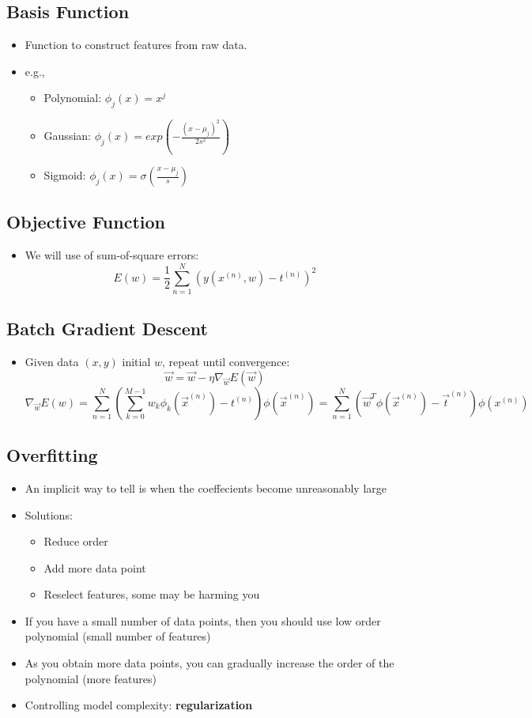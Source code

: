 \subsection{Basis Function}
\begin{itemize}
	\item Function to construct features from raw data.
	\item e.g.,
	\begin{itemize}
		\item Polynomial: $\phi_j(x)=x^j$
		\item Gaussian: $\phi_j(x)=exp(-\frac{(x-\mu_j)^2}{2s^2})$
		\item Sigmoid: $\phi_j(x)=\sigma (\frac{x-\mu_j}{s})$
	\end{itemize}
\end{itemize}

\subsection{Objective Function}
\begin{itemize}
	\item We will use of sum-of-square errors:
	$$E(w)=\frac{1}{2}\sum_{n=1}^N (y(x^{(n)}, w)-t^{(n)})^2$$
\end{itemize}

\subsection{Batch Gradient Descent}
\begin{itemize}
	\item Given data $(x,y)$ initial $w$, repeat until convergence:
	$$\vec{w}=\vec{w}-\eta \nabla_{\vec{w}} E(\vec{w})$$
	$$\nabla_{\vec{w}}E(w)=\sum_{n=1}^N \left( \sum_{k=0}^{M-1} w_k \phi_k (\vec{x}^{(n)}) - t^{(n)} \right)\phi (\vec{x}^{(n)})=\sum_{n=1}^N \left(\vec{w}^T \phi (\vec{x}^{(n)}) - \vec{t}^{(n)}\right) \phi(x^{(n)})$$
\end{itemize}

\subsection{Overfitting}
\begin{itemize}
	\item An implicit way to tell is when the coeffecients become unreasonably large
	\item Solutions:
	\begin{itemize}
		\item Reduce order
		\item Add more data point
		\item Reselect features, some may be harming you
	\end{itemize}
	\item If you have a small number of data points, then you should use low order polynomial (small number of features)
	\item As you obtain more data points, you can gradually increase the order of the polynomial (more features)
	\item Controlling model complexity: \textbf{regularization}
\end{itemize}